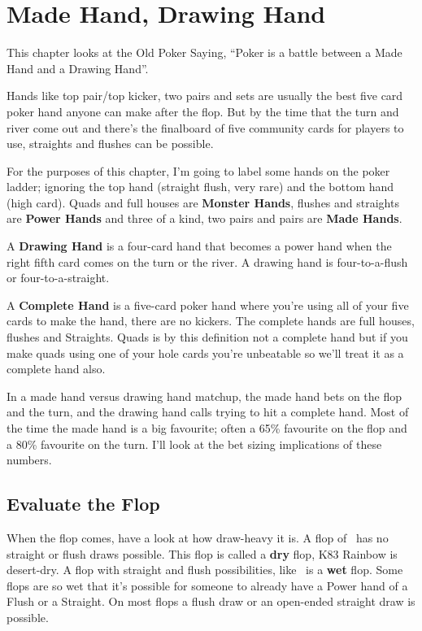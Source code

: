 \chapter{Made Hand, Drawing Hand}


This chapter looks at the Old Poker Saying, ``Poker
is a battle between a Made Hand and a Drawing Hand''.

Hands like top pair/top kicker, two pairs and sets
are usually the best five card poker hand anyone can
make after the flop. But by the time that the turn and river come out
and there's the finalboard of five community cards for players to use,
straights and flushes can be possible.

For the purposes of this chapter, I'm going to label some hands on the
poker ladder; ignoring the top hand (straight flush, very rare) and
the bottom hand (high card). Quads and full houses are \textbf{Monster
Hands}, flushes and straights are \textbf{Power Hands} and three of a
kind, two pairs and pairs are \textbf{Made Hands}.

A \textbf{Drawing Hand} is a four-card hand that becomes a power hand
when the right fifth card comes on the turn or the river. A drawing hand
is four-to-a-flush or four-to-a-straight.

A \textbf{Complete Hand} is a five-card poker hand where
you're using all of your five cards to make the hand, there are no
kickers. The complete hands are full houses, flushes and
Straights. Quads is by this definition not a complete hand
but if you make quads using one of your hole cards you're
unbeatable so we'll treat it as a complete hand also.


In a made hand versus drawing hand matchup, the made hand bets on the
flop and the turn, and the drawing hand calls trying to hit a
complete hand. Most of the time the made hand is a big favourite;
often a 65\% favourite on the flop and a 80\% favourite on the
turn. I'll look at the bet sizing implications of these numbers.

\section{Evaluate the Flop}

When the flop comes, have a look at how draw-heavy it is. A flop of
\Ks\eigh\trec\ has no straight or flush draws possible. This flop is
called a \textbf{dry} flop, K83 Rainbow is desert-dry. A flop with
straight and flush possibilities, like \tend\nined\sixc\ is a
\textbf{wet} flop. Some flops are so wet that it's possible for
someone to already have a Power hand of a Flush or a Straight. On most
flops a flush draw or an open-ended straight draw is possible.

